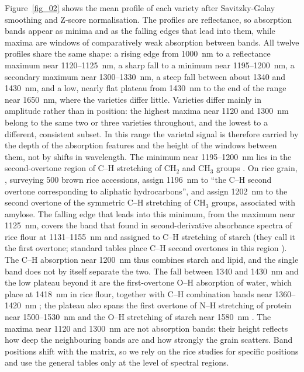\documentclass[final,5p,times,twocolumn]{elsarticle}
\newcommand{\added}[1]{{\color{blue}#1}}
\begin{document}
\added{Figure~\ref{fig_02} shows the mean profile of each variety after Savitzky-Golay smoothing and Z-score normalisation. The profiles are reflectance, so absorption bands appear as minima and as the falling edges that lead into them, while maxima are windows of comparatively weak absorption between bands. All twelve profiles share the same shape: a rising edge from 1000~nm to a reflectance maximum near 1120--1125~nm, a sharp fall to a minimum near 1195--1200~nm, a secondary maximum near 1300--1330~nm, a steep fall between about 1340 and 1430~nm, and a low, nearly flat plateau from 1430~nm to the end of the range near 1650~nm, where the varieties differ little. Varieties differ mainly in amplitude rather than in position: the highest maxima near 1120 and 1300~nm belong to the same two or three varieties throughout, and the lowest to a different, consistent subset. In this range the varietal signal is therefore carried by the depth of the absorption features and the height of the windows between them, not by shifts in wavelength.}
\added{The minimum near 1195--1200~nm lies in the second-overtone region of C--H stretching of CH$_2$ and CH$_3$ groups \citep{Workman2012}. On rice grain, \citet{John2022nirs}, surveying 500 brown rice accessions, assign 1196~nm to ``the C--H second overtone corresponding to aliphatic hydrocarbons'', and \citet{Onmarkhong2022} assign 1202~nm to the second overtone of the symmetric C--H stretching of CH$_3$ groups, associated with amylose. The falling edge that leads into this minimum, from the maximum near 1125~nm, covers the band that \citet{Shao2011starch} found in second-derivative absorbance spectra of rice flour at 1131--1155~nm and assigned to C--H stretching of starch (they call it the first overtone; standard tables place C--H second overtones in this region \citep{Workman2012}). The C--H absorption near 1200~nm thus combines starch and lipid, and the single band does not by itself separate the two. The fall between 1340 and 1430~nm and the low plateau beyond it are the first-overtone O--H absorption of water, which \citet{Shao2011starch} place at 1418~nm in rice flour, together with C--H combination bands near 1360--1420~nm \citep{Workman2012}; the plateau also spans the first overtone of N--H stretching of protein near 1500--1530~nm and the O--H stretching of starch near 1580~nm \citep{Onmarkhong2022}. The maxima near 1120 and 1300~nm are not absorption bands: their height reflects how deep the neighbouring bands are and how strongly the grain scatters. Band positions shift with the matrix, so we rely on the rice studies \citep{Shao2011starch,John2022nirs,Onmarkhong2022} for specific positions and use the general tables only at the level of spectral regions.}
\end{document}
